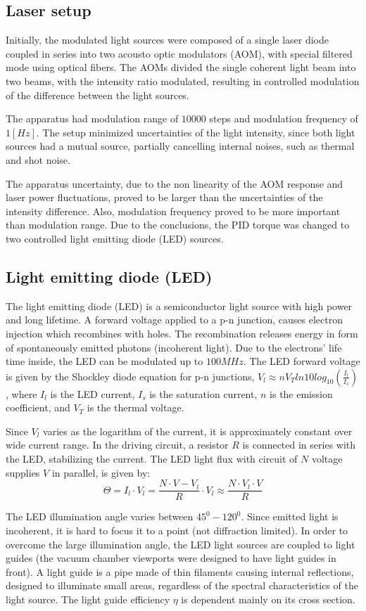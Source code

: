 \documentclass[\main/master.tex]{subfiles}
\begin{document}
\subsection{Laser setup}
Initially, the modulated light sources were composed of a single laser diode coupled in series into two acousto optic modulators (AOM), with special filtered mode using optical fibers. The AOMs divided the single coherent light beam into two beams, with the intensity ratio modulated, resulting in controlled modulation of the difference between the light sources.
\par\noindent
The apparatus had modulation range of $10000$ steps and modulation frequency of $1 [Hz]$. The setup minimized uncertainties of the light intensity, since both light sources had a mutual source, partially cancelling internal noises, such as thermal and shot noise. 
\par\noindent
The apparatus uncertainty, due to the non linearity of the AOM response and laser power fluctuations, proved to be larger than the uncertainties of the intensity difference. Also, modulation frequency proved to be more important than modulation range. Due to the conclusions, the PID torque was changed to two controlled light emitting diode (LED) sources.
\subsection{Light emitting diode (LED)}
The light emitting diode (LED) is a semiconductor light source with high power and long lifetime. A forward voltage applied to a p-n junction, causes electron injection which recombines with holes. The recombination releases energy in form of spontaneously emitted photons (incoherent light). Due to the electrons' life time inside, the LED can be modulated up to $100MHz$. The LED forward voltage is given by the Shockley diode equation for p-n junctions, $V_l \approx n V_T ln10 log_{10} (\frac{I_l}{I_s})$, where $I_l$ is the LED current, $I_s$ is the saturation current, $n$ is the emission coefficient, and $V_T$ is the thermal voltage. 
\par\noindent
Since $V_l$ varies as the logarithm of the current, it is approximately constant over wide current range. In the driving circuit, a resistor $R$ is connected in series with the LED, stabilizing the current. The LED light flux with circuit of $N$ voltage supplies $V$ in parallel, is given by:
\begin{equation}
\Theta = I_l\cdot V_l  =\frac{N\cdot V-V_l}{R}\cdot V_l\approx \frac{N\cdot V_l\cdot V}{R}\label{eqn:led power}
\end{equation}
\par\noindent
The LED illumination angle varies between $45^0-120^0$. Since emitted light is incoherent, it is hard to focus it to a point (not diffraction limited). In order to overcome the large illumination angle, the LED light sources are coupled to light guides (the vacuum chamber viewports were designed to have light guides in front). A light guide is a pipe made of thin filaments causing internal reflections, designed to illuminate small areas, regardless of the spectral characteristics of the light source. The light guide efficiency $\eta$ is dependent mainly on its cross section. 
\end{document}
